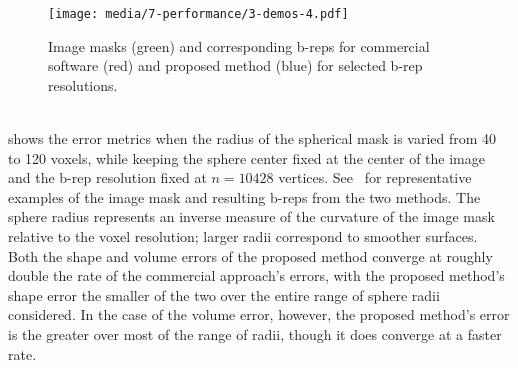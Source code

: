 \begin{figure}[ht!]
	\centering
	\texttt{[image: media/7-performance/3-demos-4.pdf]}
	\caption{Image masks (green) and corresponding b-reps for commercial software (red) and proposed method (blue) for selected b-rep resolutions.}
	\label{fig:demos1}
\end{figure} \\
%
 shows the error metrics when the radius of the spherical mask is varied from 40 to 120 voxels, while keeping the sphere center fixed at the center of the image and the b-rep resolution fixed at $n = 10428$ vertices. See~ for representative examples of the image mask and resulting b-reps from the two methods. The sphere radius represents an inverse measure of the curvature of the image mask relative to the voxel resolution; larger radii correspond to smoother surfaces. Both the shape and volume errors of the proposed method converge at roughly double the rate of the commercial approach's errors, with the proposed method's shape error the smaller of the two over the entire range of sphere radii considered.  In the case of the volume error, however, the proposed method's error is the greater over most of the range of radii, though it does converge at a faster rate.

